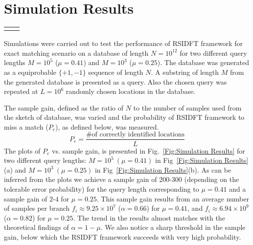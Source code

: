 \section{Simulation Results}


\begin{figure*}[h]
		\begin{tabular}{cc}
			\subfloat[$M=10^5(\mu=0.41), \tilde{N}=10^7, ~G=10^{5}$]{}&
			\subfloat[$M=10^3(\mu=0.25),~ \tilde{N}=10^6, ~G=10^{6}$]{}
		\end{tabular}
		
		\caption{Plots of probability of missing a match vs. sample gain for exact matching of a query of length $M$ from a equiprobable  binary \{+1,-1\} sequence of length $N= 10^{12}$, divided into $G$ blocks each of length $\tilde{N}$. The substring was simulated to repeat in $L=10^6$($\lambda=0.5$) locations uniformly at random.} \label{Fig:Simulation Results}
\end{figure*}

Simulations were carried out to test the performance of RSIDFT framework for exact matching scenario on a database of length $N=10^{12}$ for two different query lengths $M=10^5$ ($\mu = 0.41$) and $M=10^3$ ($\mu = 0.25$). The database was generated as a equiprobable $\{+1,-1\}$ sequence of length $N$. A substring of length $M$ from the generated database is presented as a query. Also the chosen query was repeated at $L=10^6$ randomly chosen locations in the database.

The sample gain, defined as the ratio of $N$ to the number of samples used from the sketch of database, was varied and the probability of RSIDFT framework to miss a match ($P_e$), as defined below, was measured.
\[P_e = \frac{\text{\# of correctly identified locations}}{L} \]   
The plots of $P_e$ vs. sample gain, is presented in Fig.~\ref{Fig:Simulation Results} for two different query lengths: $M=10^5~(\mu=0.41)$ in Fig~\ref{Fig:Simulation Results}(a) and $M=10^3~(\mu=0.25)$ in Fig~\ref{Fig:Simulation Results}(b). As can be inferred from the plots we achieve a sample gain of 200-300 (depending on the tolerable error probability) for the query length corresponding to  $\mu=0.41$ and a sample gain of $2$-$4$ for $\mu=0.25$. This sample gain results from an average number of samples per branch $f_i \approx 9.25 \times10^7 $ ($\alpha=0.66$) for $\mu=0.41$, and  $f_i \approx 6.94\times10^9 $ ($\alpha=0.82$) for $\mu=0.25$. The trend in the results almost matches with the theoretical findings of $\alpha = 1-\mu$. We also notice a sharp threshold in the sample gain, below which the RSIDFT framework succeeds with very high probability.    		